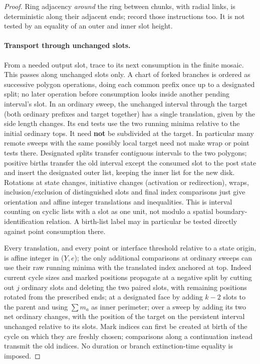 \begin{proof}
Ring adjacency \emph{around}
the ring between chunks, with radial links, is deterministic along their adjacent ends; record those
instructions too. It is not tested by an equality of an outer and inner slot height.

\paragraph{Transport through unchanged slots.}

From a needed output slot, trace to its next consumption in the finite mosaic. This passes along unchanged
slots only. A chart of forked branches is ordered as successive polygon operations, doing each common prefix
once up to a designated split; no later operation before consumption looks inside another pending interval's
slot. In an ordinary sweep, the unchanged interval through the target (both ordinary prefixes and target
together) has a single translation, given by the side length changes. Its end tests use the two running
minima relative to the initial ordinary tops. It need \textbf{not} be subdivided at the target. In
particular many remote sweeps with the same possibly local target need not make wrap or point tests there.
Designated splits transfer contiguous intervals to the two polygons; positive births transfer the old
interval except the consumed slot to the post state and insert the designated outer list, keeping the inner
list for the new disk. Rotations at state changes, initiative changes (activation or redirection), wraps,
inclusion/exclusion of distinguished slots and final index comparisons just give orientation and affine
integer translations and inequalities. This is interval counting on cyclic lists with a slot as one unit,
not modulo a spatial boundary-identification relation. A birth-list label may in particular be tested
directly against point consumption there.

Every translation, and every point or interface threshold relative
to a state origin, is affine integer in (\(Y,e\)); the only additional comparisons at ordinary sweeps can
use their raw running minima with the translated index anchored at top. Indeed current cycle sizes and
marked positions propagate at a negative split by cutting out \(j\) ordinary slots and deleting the two
paired slots, with remaining positions rotated from the prescribed ends; at a designated face by adding
\(k-2\) slots to the parent and using \(\sum m_a\) as inner perimeter; over a sweep by adding its two net
ordinary changes, with the position of the target on the persistent interval unchanged relative to its
slots. Mark indices can first be created at birth of the cycle on which they are freshly chosen; comparisons
along a continuation instead transmit the old indices. No duration or branch extinction-time equality is
imposed.


\end{proof}
